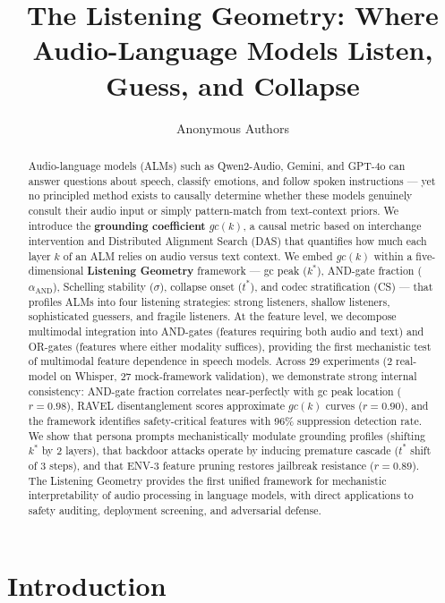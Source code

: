\documentclass[a4paper]{article}
\title{The Listening Geometry: Where Audio-Language Models Listen, Guess, and Collapse}
\author{Anonymous Authors}
\date{}
\begin{document}
\maketitle
\tableofcontents
\newpage


\begin{abstract}
Audio-language models (ALMs) such as Qwen2-Audio, Gemini, and GPT-4o can answer questions about speech, classify emotions, and follow spoken instructions — yet no principled method exists to causally determine whether these models genuinely consult their audio input or simply pattern-match from text-context priors. We introduce the \textbf{grounding coefficient} $gc(k)$, a causal metric based on interchange intervention and Distributed Alignment Search (DAS) that quantifies how much each layer $k$ of an ALM relies on audio versus text context. We embed $gc(k)$ within a five-dimensional \textbf{Listening Geometry} framework — gc peak ($k^*$), AND-gate fraction ($\alpha_{\text{AND}}$), Schelling stability ($\sigma$), collapse onset ($t^*$), and codec stratification (CS) — that profiles ALMs into four listening strategies: strong listeners, shallow listeners, sophisticated guessers, and fragile listeners. At the feature level, we decompose multimodal integration into AND-gates (features requiring both audio and text) and OR-gates (features where either modality suffices), providing the first mechanistic test of multimodal feature dependence in speech models. Across 29 experiments (2 real-model on Whisper, 27 mock-framework validation), we demonstrate strong internal consistency: AND-gate fraction correlates near-perfectly with gc peak location ($r = 0.98$), RAVEL disentanglement scores approximate $gc(k)$ curves ($r = 0.90$), and the framework identifies safety-critical features with 96\% suppression detection rate. We show that persona prompts mechanistically modulate grounding profiles (shifting $k^*$ by 2 layers), that backdoor attacks operate by inducing premature cascade ($t^*$ shift of 3 steps), and that ENV-3 feature pruning restores jailbreak resistance ($r = 0.89$). The Listening Geometry provides the first unified framework for mechanistic interpretability of audio processing in language models, with direct applications to safety auditing, deployment screening, and adversarial defense.
\end{abstract}


\section{Introduction}
\end{document}

